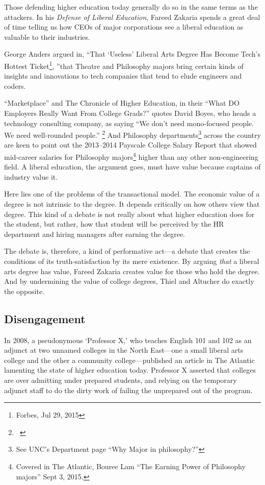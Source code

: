 Those defending higher education today generally do so in the same terms as the attackers. In his \emph{Defense of Liberal Education}, Fareed Zakaria spends a great deal of time telling us how CEOs of major corporations see a liberal education as valuable to their industries. 

George Anders argued in, ``That `Useless' Liberal Arts Degree Has Become Tech's Hottest Ticket\footnote{Forbes, Jul 29, 2015}, ''that Theatre and Philosophy majors bring certain kinds of insights and innovations to tech companies that tend to elude engineers and coders. 

``Marketplace'' and The Chronicle of Higher Education, in their ``What DO Employers Really Want From College Grads?'' quotes David Boyes, who heads a technology consulting company, as saying ``We don't need mono-focused people. We need well-rounded people.'' \footnote{~\citep{Scott:2013vc}} And Philosophy departments\footnote{See UNC's Department page ``Why Major in philosophy?''} across the country are keen to point out the 2013--2014 Payscale College Salary Report that showed mid-career salaries for Philosophy majors\footnote{Covered in The Atlantic, Bouree Lam ``The Earning Power of Philosophy majors'' Sept 3, 2015.} higher than any other non-engineering field. A liberal education, the argument goes, must have value because captains of industry value it.

Here lies one of the problems of the transactional model. The economic value of a degree is not intrinsic to the degree. It depends critically on how others view that degree. This kind of a debate is not really about what higher education does for the student, but rather, how that student will be perceived by the HR department and hiring managers after earning the degree. 

The debate is, therefore, a kind of performative act---a debate that creates the conditions of its truth-satisfaction by its mere existence. By arguing \emph{that} a liberal arts degree has value, Fareed Zakaria creates value for those who hold the degree. And by undermining the value of college degrees, Thiel and Altucher do exactly the opposite.

\subsection{Disengagement}
\label{disengagement}

In 2008, a pseudonymous `Professor X,' who teaches English 101 and 102 as an adjunct at two unnamed colleges in the North East---one a small liberal arts college and the other a community college---published an article in The Atlantic lamenting the state of higher education today. Professor X asserted that colleges are over admitting under prepared students, and relying on the temporary adjunct staff to do the dirty work of failing the unprepared out of the program.


